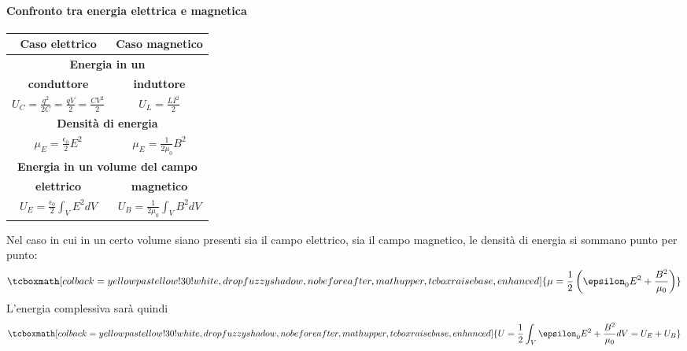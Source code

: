 \paragraph{Confronto tra energia elettrica e magnetica}
\begin{center}
	\begin{tabular}{p{}p{}}
		\multicolumn{1}{c|}{\textbf{Caso elettrico}} &
		\multicolumn{1}{c}{\textbf{Caso magnetico}} \\ \hline
		\multicolumn{2}{c}{\textbf{Energia in un}}\\
		\multicolumn{1}{c|}{\textbf{conduttore}} &
		\multicolumn{1}{c}{\textbf{induttore}} \\ \hline
		\multicolumn{1}{c|}{$\displaystyle U_C=\frac{q^2}{2C}=\frac{qV}{2}=\frac{CV^2}{2}$} & \multicolumn{1}{c}{$\displaystyle U_L=\frac{LI^2}{2}$}\\ \hline
		\multicolumn{2}{c}{\textbf{Densità di energia}}\\ \hline
		\multicolumn{1}{c|}{$\displaystyle \mu_E=\frac{\epsilon_0}{2}E^2$} & \multicolumn{1}{c}{$\displaystyle \mu_E=\frac{1}{2\mu_0}B^2$}\\ \hline
		\multicolumn{2}{c}{\textbf{Energia in un volume del campo}}\\ 
		\multicolumn{1}{c|}{\textbf{elettrico}} &
		\multicolumn{1}{c}{\textbf{magnetico}} \\ \hline
		\multicolumn{1}{c|}{$\displaystyle U_E=\frac{\epsilon_0}{2}\int_V E^2dV$} & \multicolumn{1}{c}{$\displaystyle U_B=\frac{1}{2\mu_0}\int_V B^2dV$}\\
	\end{tabular}
\end{center}
Nel caso in cui in un certo volume siano presenti sia il campo elettrico, sia il campo magnetico, le densità di energia si sommano punto per punto:
\begin{equation}
	\tcboxmath[colback=yellowpastellow!30!white,drop fuzzy shadow, nobeforeafter, math upper, tcbox raise base, enhanced]{\mu=\frac{1}{2}\left(\epsilon_0E^2+\frac{B^2}{\mu_0}\right)}
\end{equation}
L'energia complessiva sarà quindi
\begin{equation}
	\tcboxmath[colback=yellowpastellow!30!white,drop fuzzy shadow, nobeforeafter, math upper, tcbox raise base, enhanced]{U=\frac{1}{2}\int_V \epsilon_0E^2+\frac{B^2}{\mu_0}dV=U_E+U_B}
\end{equation}
